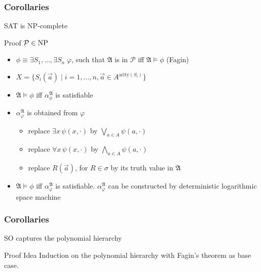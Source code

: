 \documentclass[handout]{beamer}
\newcommand{\SO}{\ensuremath{\mathrm{SO}}}
\newcommand{\NP}{{\rm NP}\xspace}
\newcommand{\SAT}{{\rm SAT}\xspace}
\newcommand{\structa}{\ensuremath{\mathfrak{A}}}
\begin{document}
\begin{frame}
  \frametitle{Corollaries}

  \begin{corollary}[Cook]
    \SAT is \NP-complete
  \end{corollary}

  \begin{alertblock}{Proof}
    $\mathcal{P} \in \NP$
    \begin{itemize}
      \item $\phi \equiv \exists S_1, \ldots, \exists S_n \; \varphi$, such that
      $\structa$ is in $\mathcal{P}$ iff $\structa \models \phi$ (Fagin)
      \item $X = \{S_i(\vec{a}) \; | \; i = 1, \ldots, n, \vec{a} \in
      A^{\text{arity}(S_i)}\}$
      \item $\structa \models \phi$ iff $\alpha_{\phi}^{\structa}$ is
      satisfiable
      \item $\alpha_{\varphi}^{\structa}$ is obtained from $\varphi$
        \begin{itemize}
          \item replace $\exists x \, \psi(x, \cdot)$ by $\bigvee_{a \in A}
          \psi(a, \cdot)$
          \item replace $\forall x \, \psi(x, \cdot)$ by $\bigwedge_{a \in A}
          \psi(a, \cdot)$
          \item replace $R(\vec{a})$, for $R \in \sigma$ by its truth value in
          $\structa$
        \end{itemize}
      \item $\structa \models \phi$ iff $\alpha_{\varphi}^{\structa}$ is
      satisfiable. $\alpha_{\varphi}^{\structa}$ can be constructed by
      deterministic logarithmic space machine
    \end{itemize}
  \end{alertblock}
\end{frame}

\begin{frame}
  \frametitle{Corollaries}
  \begin{corollary}
    $\SO$ captures the polynomial hierarchy
  \end{corollary}
  \begin{alertblock}{Proof Idea}
    Induction on the polynomial hierarchy with Fagin's theorem as base case.
  \end{alertblock}
\end{frame}



\end{document}
